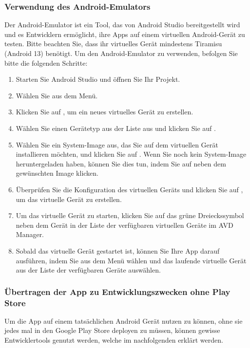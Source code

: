 \subsubsection{Verwendung des Android-Emulators}
Der Android-Emulator ist ein Tool, das von Android Studio bereitgestellt wird und es Entwicklern ermöglicht, ihre Apps auf einem virtuellen Android-Gerät zu testen. Bitte beachten Sie, dass ihr virtuelles Gerät mindestens Tiramisu (Android 13) benötigt. Um den Android-Emulator zu verwenden, befolgen Sie bitte die folgenden Schritte:\newline
\begin{enumerate}
    \item Starten Sie Android Studio und öffnen Sie Ihr Projekt.
    \item Wählen Sie  aus dem  Menü.
    \item Klicken Sie auf , um ein neues virtuelles Gerät zu erstellen.
    \item Wählen Sie einen Gerätetyp aus der Liste aus und klicken Sie auf .
    \item Wählen Sie ein System-Image aus, das Sie auf dem virtuellen Gerät installieren möchten, und klicken Sie auf . Wenn Sie noch kein System-Image heruntergeladen haben, können Sie dies tun, indem Sie auf  neben dem gewünschten Image klicken.
    \item Überprüfen Sie die Konfiguration des virtuellen Geräts und klicken Sie auf , um das virtuelle Gerät zu erstellen.
    \item Um das virtuelle Gerät zu starten, klicken Sie auf das grüne Dreieckssymbol neben dem Gerät in der Liste der verfügbaren virtuellen Geräte im AVD Manager.
    \item Sobald das virtuelle Gerät gestartet ist, können Sie Ihre App darauf ausführen, indem Sie  aus dem  Menü wählen und das laufende virtuelle Gerät aus der Liste der verfügbaren Geräte auswählen.
\end{enumerate}

\subsubsection{Übertragen der App zu Entwicklungszwecken ohne Play Store}
Um die App auf einem tatsächlichen Android Gerät nutzen zu können, ohne sie jedes mal in den Google Play Store deployen zu müssen, können gewisse Entwicklertools genutzt werden, welche im nachfolgenden erklärt werden.
